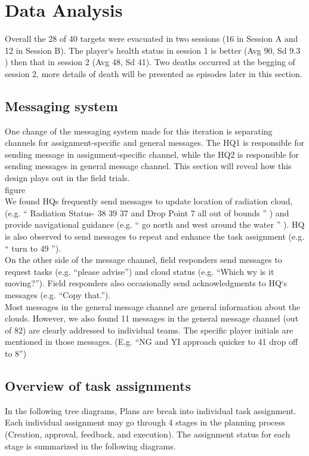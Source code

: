 \section{Data Analysis}
Overall the 28 of 40 targets were evacuated in two sessions (16 in Session A and 12 in Session B). The player`s health status in session 1 is better  (Avg 90, Sd 9.3 ) then that in session 2 (Avg 48, Sd 41). Two deaths occurred at the begging of session 2, more details of death will be presented as episodes later in this section. \\


\subsection{Messaging system}
One change of the messaging system made for this iteration is separating channels for assignment-specific and general messages. The HQ1 is responsible for sending message in assignment-specific channel, while the HQ2 is responsible for sending messages in general message channel. This section will reveal how this design plays out in the field trials. \\

figure\\

We found HQs frequently send messages to update location of radiation cloud, (e.g. `` Radiation Status- 38  39  37 and Drop Point 7 all out of bounds '' ) and provide navigational guidance (e.g. `` go north  and west around the water '' ). HQ is also observed to send messages to repeat and enhance the task assignment (e.g. `` turn to 49 '').\\

On the other side of the message channel, field responders send messages to request tasks (e.g. ``please advise'') and cloud status (e.g. ``Which wy is it moving?''). Field responders also occasionally send acknowledgments to HQ`s messages (e.g. ``Copy that.''). \\

Most messages in the general message channel are general information about the clouds. However, we also found 11 messages in the general message channel (out of 82) are clearly addressed to individual teams. The specific player initials are mentioned in those messages. (E.g. ``NG and YI approach quicker to 41 drop off to 8'')\\

\subsection{Overview of task assignments}
In the following tree diagrams, Plans are break into individual task assignment. Each individual assignment may go through 4 stages in the planning process (Creation, approval, feedback, and execution). The assignment status for each stage is summarized in the following diagrams. \\

